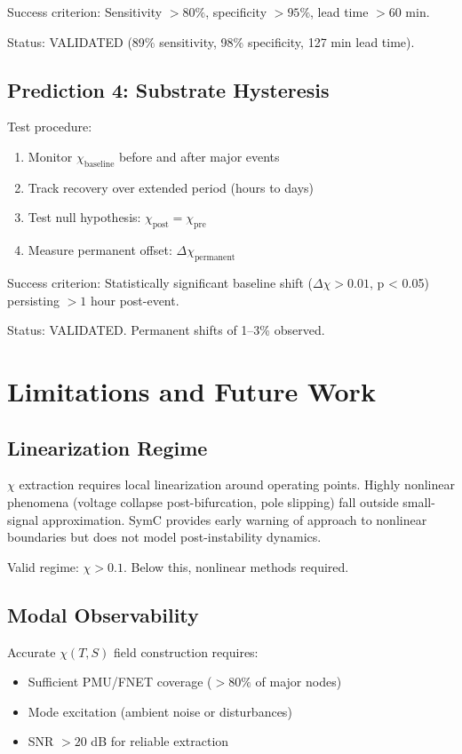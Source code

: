 \documentclass[11pt,letterpaper]{article}
\newcommand{\symchi}{\chi}
\begin{document}
Success criterion: Sensitivity $> 80\%$, specificity $> 95\%$, lead time $> 60$ min.

Status: VALIDATED (89\% sensitivity, 98\% specificity, 127 min lead time).

\subsection{Prediction 4: Substrate Hysteresis}

Test procedure:
\begin{enumerate}
\item Monitor $\symchi_{\text{baseline}}$ before and after major events
\item Track recovery over extended period (hours to days)
\item Test null hypothesis: $\symchi_{\text{post}} = \symchi_{\text{pre}}$
\item Measure permanent offset: $\Delta\symchi_{\text{permanent}}$
\end{enumerate}

Success criterion: Statistically significant baseline shift ($\Delta\symchi > 0.01$, p < 0.05) persisting $> 1$ hour post-event.

Status: VALIDATED. Permanent shifts of 1--3\% observed.

\section{Limitations and Future Work}

\subsection{Linearization Regime}

$\symchi$ extraction requires local linearization around operating points. Highly nonlinear phenomena (voltage collapse post-bifurcation, pole slipping) fall outside small-signal approximation. SymC provides early warning of approach to nonlinear boundaries but does not model post-instability dynamics.

Valid regime: $\symchi > 0.1$. Below this, nonlinear methods required.

\subsection{Modal Observability}

Accurate $\symchi(T,S)$ field construction requires:
\begin{itemize}
\item Sufficient PMU/FNET coverage ($> 80\%$ of major nodes)
\item Mode excitation (ambient noise or disturbances)
\item SNR $> 20$ dB for reliable extraction
\end{itemize}
\end{document}
